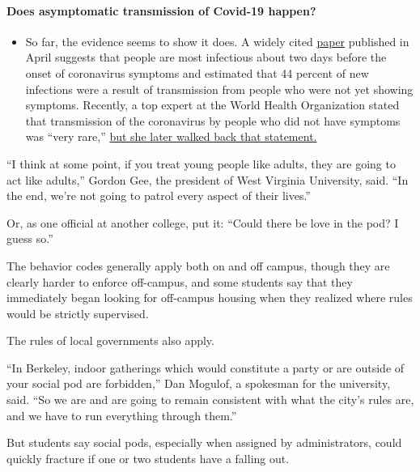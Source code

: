 \begin{itemize}
{  \paragraph{Does asymptomatic transmission of Covid-19
  happen?}\label{does-asymptomatic-transmission-of-covid-19-happen}}

  \begin{itemize}
  \tightlist
  \item
    So far, the evidence seems to show it does. A widely cited
    \href{https://www.nature.com/articles/s41591-020-0869-5}{paper}
    published in April suggests that people are most infectious about
    two days before the onset of coronavirus symptoms and estimated that
    44 percent of new infections were a result of transmission from
    people who were not yet showing symptoms. Recently, a top expert at
    the World Health Organization stated that transmission of the
    coronavirus by people who did not have symptoms was ``very rare,''
    \href{https://www.nytimes3xbfgragh.onion/2020/06/09/world/coronavirus-updates.html?action=click\&pgtype=Article\&state=default\&region=MAIN_CONTENT_3\&context=storylines_faq\#link-1f302e21}{but
    she later walked back that statement.}
  \end{itemize}
\end{itemize}

``I think at some point, if you treat young people like adults, they are
going to act like adults,'' Gordon Gee, the president of West Virginia
University, said. ``In the end, we're not going to patrol every aspect
of their lives.''

Or, as one official at another college, put it: ``Could there be love in
the pod? I guess so.''

The behavior codes generally apply both on and off campus, though they
are clearly harder to enforce off-campus, and some students say that
they immediately began looking for off-campus housing when they realized
where rules would be strictly supervised.

The rules of local governments also apply.

``In Berkeley, indoor gatherings which would constitute a party or are
outside of your social pod are forbidden,'' Dan Mogulof, a spokesman for
the university, said. ``So we are and are going to remain consistent
with what the city's rules are, and we have to run everything through
them.''

But students say social pods, especially when assigned by
administrators, could quickly fracture if one or two students have a
falling out.

